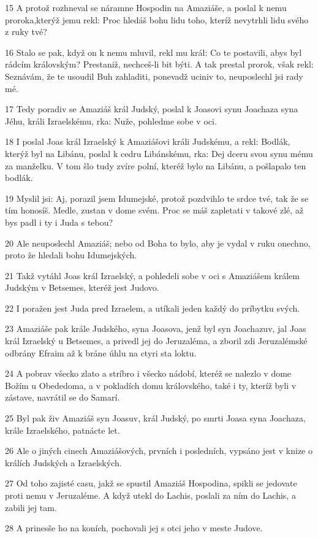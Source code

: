 \par 15 A protož rozhneval se náramne Hospodin na Amaziáše, a poslal k nemu proroka,kterýž jemu rekl: Proc hledáš bohu lidu toho, kteríž nevytrhli lidu svého z ruky tvé?
\par 16 Stalo se pak, když on k nemu mluvil, rekl mu král: Co te postavili, abys byl rádcím královským? Prestaniž, nechceš-li bit býti. A tak prestal prorok, však rekl: Seznávám, že te usoudil Buh zahladiti, ponevadž uciniv to, neuposlechl jsi rady mé.
\par 17 Tedy poradiv se Amaziáš král Judský, poslal k Joasovi synu Joachaza syna Jéhu, králi Izraelskému, rka: Nuže, pohledme sobe v oci.
\par 18 I poslal Joas král Izraelský k Amaziášovi králi Judskému, a rekl: Bodlák, kterýž byl na Libánu, poslal k cedru Libánskému, rka: Dej dceru svou synu mému za manželku. V tom šlo tudy zvíre polní, kteréž bylo na Libánu, a pošlapalo ten bodlák.
\par 19 Myslil jsi: Aj, porazil jsem Idumejské, protož pozdvihlo te srdce tvé, tak že se tím honosíš. Medle, zustan v dome svém. Proc se máš zapletati v takové zlé, až bys padl i ty i Juda s tebou?
\par 20 Ale neuposlechl Amaziáš; nebo od Boha to bylo, aby je vydal v ruku onechno, proto že hledali bohu Idumejských.
\par 21 Takž vytáhl Joas král Izraelský, a pohledeli sobe v oci s Amaziášem králem Judským v Betsemes, kteréž jest Judovo.
\par 22 I poražen jest Juda pred Izraelem, a utíkali jeden každý do príbytku svých.
\par 23 Amaziáše pak krále Judského, syna Joasova, jenž byl syn Joachazuv, jal Joas král Izraelský u Betsemes, a privedl jej do Jeruzaléma, a zboril zdi Jeruzalémské odbrány Efraim až k bráne úhlu na ctyri sta loktu.
\par 24 A pobrav všecko zlato a stríbro i všecko nádobí, kteréž se nalezlo v dome Božím u Obededoma, a v pokladích domu královského, také i ty, kteríž byli v zástave, navrátil se do Samarí.
\par 25 Byl pak živ Amaziáš syn Joasuv, král Judský, po smrti Joasa syna Joachaza, krále Izraelského, patnácte let.
\par 26 Ale o jiných cinech Amaziášových, prvních i posledních, vypsáno jest v knize o králích Judských a Izraelských.
\par 27 Od toho zajisté casu, jakž se spustil Amaziáš Hospodina, spikli se jedovate proti nemu v Jeruzaléme. A když utekl do Lachis, poslali za ním do Lachis, a zabili jej tam.
\par 28 A prinesše ho na koních, pochovali jej s otci jeho v meste Judove.

